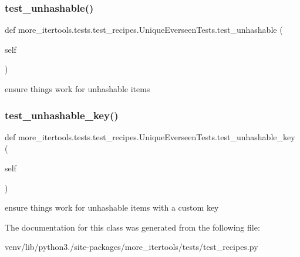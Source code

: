 \subsubsection{\texorpdfstring{test\+\_\+unhashable()}{test\_unhashable()}}
{\footnotesize\ttfamily def more\+\_\+itertools.\+tests.\+test\+\_\+recipes.\+Unique\+Everseen\+Tests.\+test\+\_\+unhashable (\begin{DoxyParamCaption}\item[{}]{self }\end{DoxyParamCaption})}

\begin{DoxyVerb}ensure things work for unhashable items\end{DoxyVerb}
 \mbox{\label{classmore__itertools_1_1tests_1_1test__recipes_1_1_unique_everseen_tests_aec94081f292b9be38ffb4dea853e3ad2}} 
\subsubsection{\texorpdfstring{test\+\_\+unhashable\+\_\+key()}{test\_unhashable\_key()}}
{\footnotesize\ttfamily def more\+\_\+itertools.\+tests.\+test\+\_\+recipes.\+Unique\+Everseen\+Tests.\+test\+\_\+unhashable\+\_\+key (\begin{DoxyParamCaption}\item[{}]{self }\end{DoxyParamCaption})}

\begin{DoxyVerb}ensure things work for unhashable items with a custom key\end{DoxyVerb}
 

The documentation for this class was generated from the following file\+:\begin{DoxyCompactItemize}
\item 
venv/lib/python3./site-\/packages/more\+\_\+itertools/tests/test\+\_\+recipes.\+py\end{DoxyCompactItemize}

